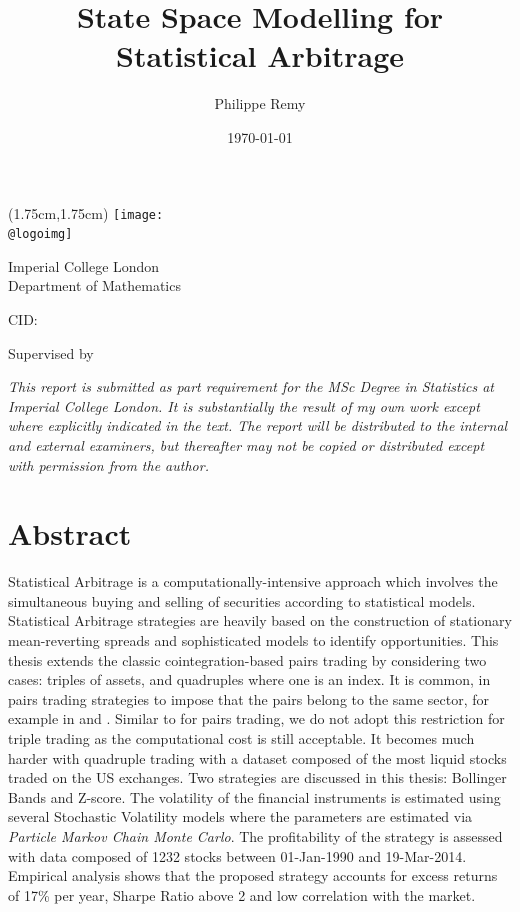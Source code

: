 \documentclass[11pt,a4,twosided,singlespacing,titlepagenumber=on]{scrreprt}
\title{State Space Modelling for Statistical Arbitrage}
\author{Philippe Remy}
\date{\today}
\makeatletter
\numberwithin{equation}{chapter} %
\theoremstyle{remark}
\renewcommand{\maketitle}{
\begin{titlepage}
\ifdefined\@logoimg
\begin{textblock*}{8cm}(1.75cm,1.75cm)
\texttt{[image: \\@logoimg]}
\end{textblock*}
\vspace*{1cm}
\else
\fi
\begin{center}
\vspace*{\stretch{0.1}}
Imperial College London\\
Department of Mathematics\par
\vspace*{\stretch{1}} %
{\titlefont\Huge \@title\par} %
\vspace*{\stretch{2}}
{\Large \@author \par}
\vspace*{1em}
{\large CID: \@CID \par}
\vspace*{\stretch{0.5}}
{\large Supervised by \@supervisor \par}
\vspace*{\stretch{3}}
\@date
\vspace*{\stretch{1}}

\end{center}%
\textit{
This report is submitted as part requirement for the MSc Degree in Statistics at Imperial College London. It is substantially the result of my own work except where explicitly indicated in the text. The report will be distributed to the internal and external examiners, but thereafter may not be copied or distributed except with permission from the author.}
\vspace*{\stretch{0.1}}
\end{titlepage}%
}
\renewenvironment{abstract}%
{\chapter*{Abstract}\thispagestyle{plain}}%
{\clearpage}
\makeatother
\begin{document}


\maketitle


\begin{abstract}
Statistical Arbitrage is a computationally-intensive approach which involves the simultaneous buying and selling of securities according to statistical models. Statistical Arbitrage strategies are heavily based on the construction of stationary mean-reverting spreads and sophisticated models to identify opportunities. This thesis extends the classic cointegration-based pairs trading by considering two cases: triples of assets, and quadruples where one is an index. It is common, in pairs trading strategies to impose that the pairs belong to the same sector, for example in \cite{chan2009} and \cite{dunis2010}. Similar to \cite{caldeira2013} for pairs trading, we do not adopt this restriction for triple trading as the computational cost is still acceptable. It becomes much harder with quadruple trading with a dataset composed of the most liquid stocks traded on the US exchanges. Two strategies are discussed in this thesis: Bollinger Bands and Z-score. The volatility of the financial instruments is estimated using several Stochastic Volatility models where the parameters are estimated via \textit{Particle Markov Chain Monte Carlo}. The profitability of the strategy is assessed with data composed of 1232 stocks between 01-Jan-1990 and 19-Mar-2014. Empirical analysis shows that the proposed strategy accounts for excess returns of 17\% per year, Sharpe Ratio above 2 and low correlation with the market.

\end{abstract}


\renewcommand{\contentsname}{Table of Contents}
\tableofcontents

\listoffigures
\listoftables



\end{document}
